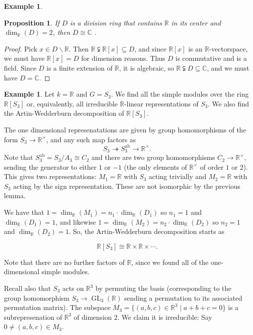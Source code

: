 \documentclass{amsart}[12pt]
\newcommand{\onto}{\twoheadrightarrow}
\newcommand{\R}{{\mathbb{R}}}
\newcommand{\C}{\mathbb{C}}
\numberwithin{equation}{section}
\theoremstyle{plain} %
\newtheorem{prop}[equation]{Proposition}
\theoremstyle{definition}
\newtheorem{ex}[equation]{Example}
\theoremstyle{remark}
\newcommand{\GL}{\operatorname{GL}}
\begin{document}
\begin{ex}
\begin{prop} If $D$ is a division ring that contains $\R$ in its center and $\dim_\R(D) =2$, then $D \cong \C$ .
\end{prop}

\begin{proof} Pick $x \in D \smallsetminus \R$. Then $\R \subsetneqq \R[x] \subseteq D$, and since $\R[x]$ is an $\R$-vectorspace, we must have $\R[x] = D$ for dimension reasons. Thus $D$ is commutative and is a field. Since $D$ is a finite extension of $\R$, it is algebraic, so $\R \subsetneqq D \subseteq \C$, and we must have $D=\C$.
\end{proof}



\begin{ex} Let $k = \R$ and $G = S_3$. We find all the simple modules over the ring $\R[S_3]$ or, equivalently,
  all irreducible $\R$-linear representations of $S_3$. We also find the Artin-Wedderburn decomposition of $\R[S_3]$.

The one dimensional represenatations are given by group homomorphisms of the form $S_3 \to \R^\times$, and any such map factors as
  $$
  S_3 \onto S_3^{\mathrm{ab}} \to \R^\times.
  $$
  Note that $S_3^{\mathrm{ab}} = S_3/A_3 \cong C_2$ and there are two group homomorphisms $C_2 \to \R^\times$, sending the generator to
  either $1$ or $-1$ (the only elements of $\R^\times$ of order $1$ or $2$).
This gives two representations: $M_1 = \R$ with $S_3$ acting trivially and $M_2 = \R$ with $S_3$ acting by the sign representation. These are not isomorphic by the previous lemma.

We have that $1= \dim_{\R}(M_1) = n_1 \cdot \dim_{\R}(D_1)$ so $n_1=1$ and $\dim_{\R}(D_1)=1$, and likewise $1= \dim_{\R}(M_2) = n_2 \cdot \dim_{\R}(D_2)$ so $n_2=1$ and $\dim_{\R}(D_2)=1$. So, the Artin-Wedderburn decomposition starts as

\[ \R[S_3] \cong \R \times \R \times \cdots.\]

Note that there are no further factors of $\R$, since we found all of the one-dimensional simple modules.


Recall also that $S_3$ acts on $\R^3$ by permuting the basis (corresponding to the group homomorphism $S_3 \to \GL_3(\R)$ sending
a permutation to its associated permutation matrix). 
The subspace $M_3 = \{(a,b,c) \in \R^3 \mid a + b + c = 0\}$ is a subrepresenation of $\R^3$ of dimension $2$.
We claim it is irreducible:  Say $0 \ne (a,b,c) \in M_3$. 


\end{ex}
\end{ex}
\end{document}
